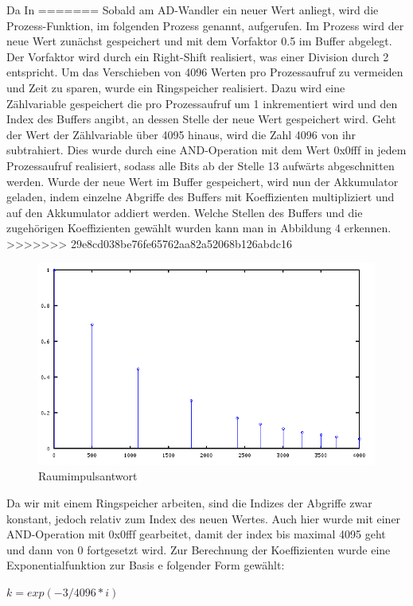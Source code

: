 \documentclass[a4paper,12pt,fontsize=12,DIV=12]{scrartcl}
\begin{document}
Da 
In 
=======
Sobald am AD-Wandler ein neuer Wert anliegt, wird die Prozess-Funktion, im folgenden Prozess genannt, aufgerufen. Im Prozess wird der neue Wert zunächst gespeichert und mit dem Vorfaktor 0.5 im Buffer abgelegt. Der Vorfaktor wird durch ein Right-Shift realisiert, was einer Division durch 2 entspricht. Um das Verschieben von 4096 Werten pro Prozessaufruf zu vermeiden und Zeit zu sparen, wurde ein Ringspeicher realisiert. Dazu wird eine Zählvariable gespeichert die pro Prozessaufruf um 1 inkrementiert wird und den Index des Buffers angibt, an dessen Stelle der neue Wert gespeichert wird. Geht der Wert der Zählvariable über 4095 hinaus, wird die Zahl 4096 von ihr subtrahiert. Dies wurde durch eine AND-Operation mit dem Wert 0x0fff in jedem Prozessaufruf realisiert, sodass alle Bits ab der Stelle 13  aufwärts abgeschnitten werden.
Wurde der neue Wert im Buffer gespeichert, wird nun der Akkumulator geladen, indem einzelne Abgriffe des Buffers mit Koeffizienten multipliziert und auf den Akkumulator addiert werden. Welche Stellen des Buffers und die zugehörigen Koeffizienten gewählt wurden kann man in Abbildung 4 erkennen.
>>>>>>> 29e8cd038be76fe65762aa82a52068b126abdc16
\begin{figure}[h]
	\includegraphics[scale=0.5]{Bilder/signalabgriffe.png}
	\caption{Raumimpulsantwort}
	\label{labelname}
\end{figure}
Da wir mit einem Ringspeicher arbeiten, sind die Indizes der Abgriffe zwar konstant, jedoch relativ zum Index des neuen Wertes. Auch hier wurde mit einer AND-Operation mit 0x0fff gearbeitet, damit der index bis maximal 4095 geht und dann von 0 fortgesetzt wird.
Zur Berechnung der Koeffizienten wurde eine Exponentialfunktion zur Basis e folgender Form gewählt:

$k=exp(-3/4096*i)$
 
\end{document}
